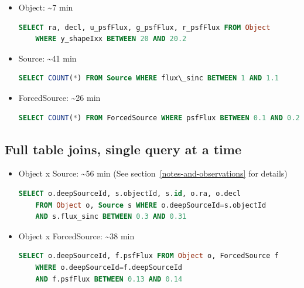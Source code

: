 \documentclass[DM,toc]{lsstdoc}
\begin{document}
\begin{itemize}
\item
  Object: \textasciitilde{}7 min

\begin{lstlisting}[language=SQL]
SELECT ra, decl, u_psfFlux, g_psfFlux, r_psfFlux FROM Object
    WHERE y_shapeIxx BETWEEN 20 AND 20.2
\end{lstlisting}

\item
  Source: \textasciitilde{}41 min

\begin{lstlisting}[language=SQL]
SELECT COUNT(*) FROM Source WHERE flux\_sinc BETWEEN 1 AND 1.1
\end{lstlisting}

\item
  ForcedSource: \textasciitilde{}26 min

\begin{lstlisting}[language=SQL]
SELECT COUNT(*) FROM ForcedSource WHERE psfFlux BETWEEN 0.1 AND 0.2
\end{lstlisting}

\end{itemize}


\subsection{Full table joins, single query at
a
time}\label{full-table-joins-single-query-at-a-time}

\begin{itemize}
\item
  Object x Source: \textasciitilde{}56 min (See section~\ref{notes-and-observations}
  for details)

\begin{lstlisting}[language=SQL]
SELECT o.deepSourceId, s.objectId, s.id, o.ra, o.decl
    FROM Object o, Source s WHERE o.deepSourceId=s.objectId
    AND s.flux_sinc BETWEEN 0.3 AND 0.31
\end{lstlisting}

\item
  Object x ForcedSource: \textasciitilde{}38 min

\begin{lstlisting}[language=SQL]
SELECT o.deepSourceId, f.psfFlux FROM Object o, ForcedSource f
    WHERE o.deepSourceId=f.deepSourceId
    AND f.psfFlux BETWEEN 0.13 AND 0.14
\end{lstlisting}

\end{itemize}
\end{document}
